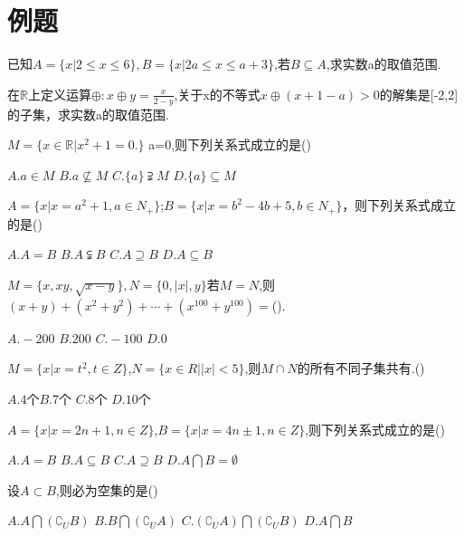 \section{例题}
\begin{example}
已知$A=\{x|2\leq x \leq 6\},B=\{x|2a\leq x\leq a+3\}$,若$B\subseteq A$,求实数a的取值范围.\\
\vspace{2cm}
\end{example}
\begin{example}
	在$\mathbb{R}$上定义运算$\oplus:x\oplus y=\frac{x}{2-y}$,关于x的不等式$x\oplus (x+1-a)>0$的解集是[-2,2]的子集，求实数a的取值范围.
\end{example}
\begin{example}
	$M=\{x\in \mathbb{R}|x^2+1=0.\}$ a=0,则下列关系式成立的是(\qquad)\par
	$A.a\in M$ \hfil $B.a\nsubseteq M$ \hfil  $C.\{a\}\supsetneqq M $ \hfil $D.\{a\}\subseteq M $
\end{example}
\begin{example}
$A=\{x|x=a^2+1,a\in N_+\}$;$B=\{x|x=b^2-4b+5,b\in N_+\}$，则下列关系式成立的是(\quad)\par
$A.A=B$  \hfil $B.A\subsetneqq B$ \hfil $C.A\supseteq B$ \hfil  $D.A\subseteq B$
\end{example}
\begin{example}
	$M=\{x,xy,\sqrt{x-y}\},N=\{0,|x|,y\}$若$M=N$,则$(x+y)+(x^2+y^2)+\cdots +(x^{100}+y^{100})=$(\qquad).\par
	$A.-200$  \hfil  $B.200$   \hfil  $C.-100$ \hfil  $D.0$
	
\end{example}
\begin{example}
$M=\{x|x=t^2,t\in Z\}$,$N=\{x\in R||x|<5\}$,则$M\cap N$的所有不同子集共有.(\quad)\par
$A.4$个\hfil  $B.7$个  \hfil    $C.8$个  \hfil    $D.10$个
\end{example}
\begin{example}
	$A=\{x|x=2n+1,n\in Z\}$,$B=\{x|x=4n\pm 1,n\in Z\}$,则下列关系式成立的是()\par
	$A.A=B$ \hfil $B.A\subseteq B$  \hfil  $C.A\supseteq B$ \hfil  $D.A\bigcap B=\emptyset $
\end{example}
\begin{example}
设$A\subset B$,则必为空集的是(\quad)\par
	$A.A\bigcap (\complement _U B)$ \hfil $B.B\bigcap (\complement _U A)$ \hfil  $C.(\complement _U A)\bigcap (\complement _U B)$ \hfil $D.A\bigcap B$
\end{example}
